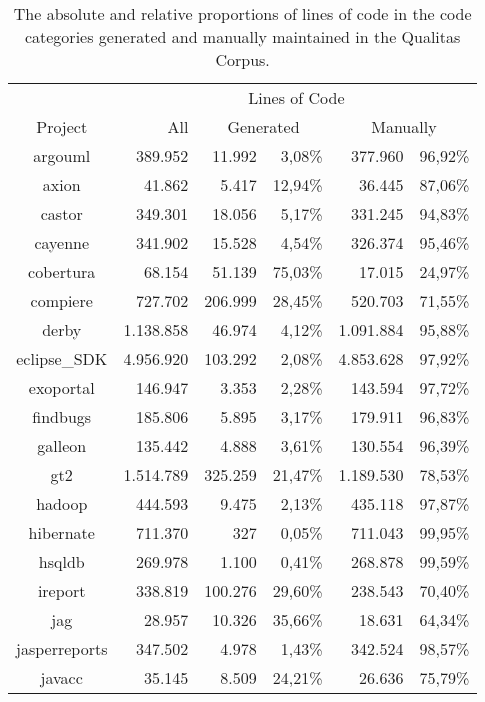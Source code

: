\setlength{\extrarowheight}{-.17em}
\begin{table}
	\caption[Lines of code distributions in the Qualitas Corpus.]{The absolute and relative proportions of lines of code in the code categories generated and manually maintained in the Qualitas Corpus.}
	\label{table:locQualitasCorpus}
	\begin{tabularx}{\textwidth}{c|r|r|r|r|r}
		& \multicolumn{5}{c}{Lines of Code}  \\
		Project & All & \multicolumn{2}{c|}{Generated} & \multicolumn{2}{c}{Manually}  \\
		\hline
		argouml & 389.952 & 11.992 & 3,08\% & 377.960 & 96,92\% \\
		axion & 41.862 & 5.417 & 12,94\% & 36.445 & 87,06\% \\
		castor & 349.301 & 18.056 & 5,17\% & 331.245 & 94,83\% \\
		cayenne & 341.902 & 15.528 & 4,54\% & 326.374 & 95,46\% \\
		cobertura & 68.154 & 51.139 & 75,03\% & 17.015 & 24,97\% \\
		compiere & 727.702 & 206.999 & 28,45\% & 520.703 & 71,55\% \\
		derby & 1.138.858 & 46.974 & 4,12\% & 1.091.884 & 95,88\% \\
		eclipse\_SDK & 4.956.920 & 103.292 & 2,08\% & 4.853.628 & 97,92\% \\
		exoportal & 146.947 & 3.353 & 2,28\% & 143.594 & 97,72\% \\
		findbugs & 185.806 & 5.895 & 3,17\% & 179.911 & 96,83\% \\
		galleon & 135.442 & 4.888 & 3,61\% & 130.554 & 96,39\% \\
		gt2 & 1.514.789 & 325.259 & 21,47\% & 1.189.530 & 78,53\% \\
		hadoop & 444.593 & 9.475 & 2,13\% & 435.118 & 97,87\% \\
		hibernate & 711.370 & 327 & 0,05\% & 711.043 & 99,95\% \\
		hsqldb & 269.978 & 1.100 & 0,41\% & 268.878 & 99,59\% \\
		ireport & 338.819 & 100.276 & 29,60\% & 238.543 & 70,40\% \\
		jag & 28.957 & 10.326 & 35,66\% & 18.631 & 64,34\% \\
		jasperreports & 347.502 & 4.978 & 1,43\% & 342.524 & 98,57\% \\
		javacc & 35.145 & 8.509 & 24,21\% & 26.636 & 75,79\% \\

\end{tabularx}
\end{table}
